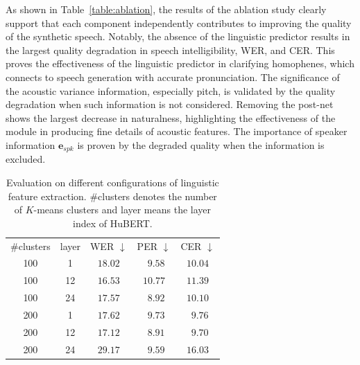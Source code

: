 \documentclass[letterpaper]{article} %
\begin{document}
As shown in Table~\ref{table:ablation}, the results of the ablation study clearly support that each component independently contributes to improving the quality of the synthetic speech.
Notably, the absence of the linguistic predictor results in the largest quality degradation in speech intelligibility, WER, and CER. This proves the effectiveness of the linguistic predictor in clarifying homophenes, which connects to speech generation with accurate pronunciation.
The significance of the acoustic variance information, especially pitch, is validated by the quality degradation when such information is not considered.
Removing the post-net shows the largest decrease in naturalness, highlighting the effectiveness of the module in producing fine details of acoustic features.
The importance of speaker information $\boldsymbol{e}_{spk}$ is proven by the degraded quality when the information is excluded.

\begin{table}
\centering
{
\begin{tabular}{ccccc}
\toprule
\#clusters
      &layer   &WER $\downarrow$  &PER $\downarrow$ &CER $\downarrow$    \\  \cmidrule(lr){1-5}

    100  &1       &$18.02$ &$~~9.58$  &$10.04$     \\
    100  &12 &$\mathbf{16.53}$ & $10.77$ & $11.39$ \\
    100  &24 &$17.57$ &$~~8.92$ &$10.10$ \\ \cmidrule(lr){1-5}
    200  &1  &$17.62$ &$~~9.73$ &$~~9.76$ \\
    200  &12 &$17.12$ &$~~\mathbf{8.91}$ &$~~\mathbf{9.70}$ \\
    200  &24 &$29.17$ &$~~9.59$ &$16.03$  \\
\bottomrule
\end{tabular}
}
\caption{Evaluation on different configurations of linguistic feature extraction. \#clusters denotes the number of $K$-means clusters and layer means the layer index of HuBERT.}
\label{table:SSL}
\end{table}
\end{document}
